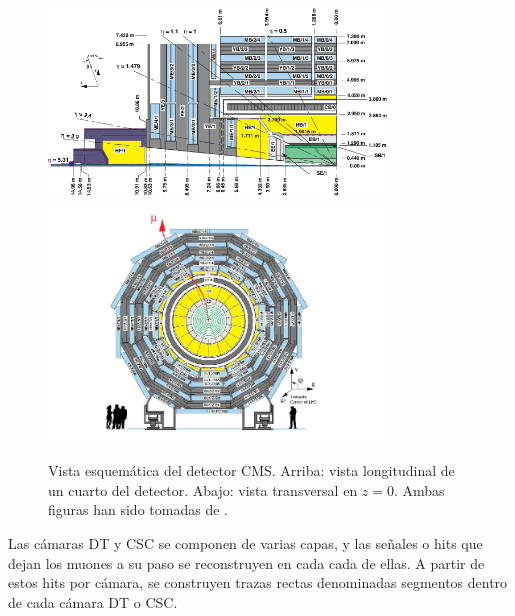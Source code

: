 \begin{figure}
\centering
\includegraphics[width=0.8\textwidth]{figures/CMSview1.png}
\includegraphics[width=0.8\textwidth]{figures/CMSview.png}
\caption{Vista esquem\'atica del detector CMS. Arriba: vista longitudinal de un cuarto del detector. Abajo: vista transversal en $z = 0$. Ambas figuras han sido tomadas de \cite{DTperformance}.}
\label{fig:CMSsub}
\end{figure}


Las c\'amaras DT y CSC se componen de varias capas, y las se\~nales o hits que dejan los muones a su paso se reconstruyen en cada cada de ellas. A partir de estos hits por c\'amara, se construyen trazas rectas denominadas segmentos dentro de cada c\'amara DT o CSC. 
